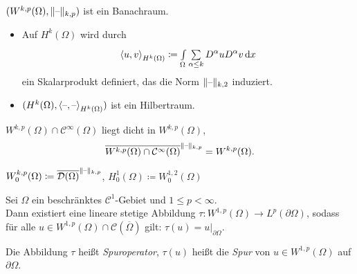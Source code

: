 \documentclass{cheat-sheet}
\newcommand{\Cont}{\mathcal{C}} %
\newcommand{\clos}[1]{\overline{#1}} %
\newcommand{\scp}[2]{\left\langle #1 , #2 \right\rangle} %
\newcommand{\Testfun}{\mathcal{D}} %
\begin{document}
\begin{satz}
  $(W^{k,p}(\Omega), \lVert\text{--}\rVert_{k,p})$ ist ein Banachraum.
\end{satz}


\begin{bem}
  \begin{itemize}
    \item Auf $H^k(\Omega)$ wird durch
    \[
      \scp{u}{v}_{H^k(\Omega)} \coloneqq \Int{\Omega}{}{\sum_{\alpha \leq k} D^\alpha u D^\alpha v}{x}
    \]
    ein Skalarprodukt definiert, das die Norm $\lVert\text{--}\rVert_{k,2}$ induziert.
    \item $(H^k(\Omega), \scp{\blank}{\blank}_{H^k(\Omega)})$ ist ein Hilbertraum.
  \end{itemize}
\end{bem}


\begin{satz}["`$H = W$"'] %
  $W^{k,p}(\Omega) \cap \Cont^\infty(\Omega)$ liegt dicht in $W^{k,p}(\Omega)$, \dh{}
  \[
    \clos{W^{k,p}(\Omega) \cap \Cont^\infty(\Omega)}^{\norm{\blank}_{k,p}} = W^{k,p}(\Omega).
  \]
\end{satz}

\begin{defn}
  $W_0^{k,p}(\Omega) \coloneqq \clos{\Testfun(\Omega)}^{\norm{\blank}_{k,p}}$, \quad
  $H_0^1(\Omega) \coloneqq W^{1,2}_0(\Omega)$
\end{defn}

\begin{satz}
  Sei $\Omega$ ein beschränktes $\Cont^1$-Gebiet und $1 \leq p < \infty$. \\
  Dann existiert eine lineare stetige Abbildung $\tau : W^{1,p}(\Omega) \to L^p(\partial \Omega)$, sodass für alle $u \in W^{1,p}(\Omega) \cap \Cont(\clos{\Omega})$ gilt: $\tau(u) = u|_{\partial \Omega}$.
\end{satz}


\begin{defn}
  Die Abbildung $\tau$ heißt \emph{Spuroperator}, $\tau(u)$ heißt die \emph{Spur} von $u \in W^{1,p}(\Omega)$ auf $\partial \Omega$.
\end{defn}
\end{document}
